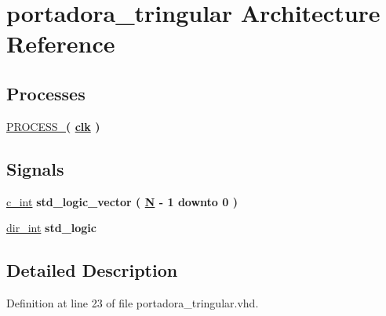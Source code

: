 \hypertarget{classportadora__tringular_1_1portadora__tringular}{}\section{portadora\+\_\+tringular Architecture Reference}
\label{classportadora__tringular_1_1portadora__tringular}
\subsection*{Processes}
 \begin{DoxyCompactItemize}
\item 
\hyperlink{classportadora__tringular_1_1portadora__tringular_a9d3814991b9352ab295cc62784226977}{P\+R\+O\+C\+E\+S\+S\+\_}{\bfseries  ( {\bfseries {\bfseries \hyperlink{classportadora__tringular_a4a4609c199d30b3adebbeb3a01276ec5}{clk}} \textcolor{vhdlchar}{ }} )}
\end{DoxyCompactItemize}
\subsection*{Signals}
 \begin{DoxyCompactItemize}
\item 
\hyperlink{classportadora__tringular_1_1portadora__tringular_ae3b6c46c82d8260487d5f5291a70a96a}{c\+\_\+int} {\bfseries \textcolor{comment}{std\+\_\+logic\+\_\+vector}\textcolor{vhdlchar}{ }\textcolor{vhdlchar}{(}\textcolor{vhdlchar}{ }\textcolor{vhdlchar}{ }\textcolor{vhdlchar}{ }\textcolor{vhdlchar}{ }{\bfseries \hyperlink{classportadora__tringular_af8ee6f7e8fea0e211d86d8e3fd6f8d29}{N}} \textcolor{vhdlchar}{-\/}\textcolor{vhdlchar}{ } \textcolor{vhdldigit}{1} \textcolor{vhdlchar}{ }\textcolor{keywordflow}{downto}\textcolor{vhdlchar}{ }\textcolor{vhdlchar}{ } \textcolor{vhdldigit}{0} \textcolor{vhdlchar}{ }\textcolor{vhdlchar}{)}\textcolor{vhdlchar}{ }} 
\item 
\hyperlink{classportadora__tringular_1_1portadora__tringular_ae27566c74fe97a2b3c215e94dc35dd47}{dir\+\_\+int} {\bfseries \textcolor{comment}{std\+\_\+logic}\textcolor{vhdlchar}{ }} 
\end{DoxyCompactItemize}


\subsection{Detailed Description}


Definition at line 23 of file portadora\+\_\+tringular.\+vhd.



